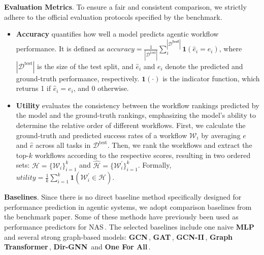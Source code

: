 \textbf{Evaluation Metrics}. To ensure a fair and consistent comparison, we strictly adhere to the official evaluation protocols specified by the benchmark.
\begin{itemize}[leftmargin=12pt, nosep, noitemsep]
    \item \textbf{Accuracy} quantifies how well a model predicts agentic workflow performance. It is defined as $accuracy = \frac{1}{|\mathcal{D}^{\text{test}}|} \sum_{i}^{|\mathcal{D}^{\textbf{test}}|}\mathbf{1}(\hat{e}_i = e_i)$, where $|\mathcal{D}^{\text{test}}|$ is the size of the test split, and $\hat{e}_i$ and $e_i$ denote the predicted and ground-truth performance, respectively. $\mathbf{1}(\cdot)$ is the indicator function, which returns 1 if $\hat{e}_i = e_i$, and 0 otherwise.

    \item \textbf{Utility} evaluates the consistency between the workflow rankings predicted by the model and the ground-truth rankings, emphasizing the model's ability to determine the relative order of different workflows. First, we calculate the ground-truth and predicted success rates of a workflow $\mathcal{W}_i$ by averaging $e$ and $\hat{e}$ across all tasks in $\mathcal{D}^{\text{test}}$. Then, we rank the workflows and extract the top-$k$ workflows according to the respective scores, resulting in two ordered sets: $\mathcal{H} = \{\mathcal{W}_i\}_{i=1}^k$ and $\hat{\mathcal{H}} = \{\mathcal{W}^\prime_i\}_{i=1}^k$. Formally, $utility = \frac{1}{k}\sum_{i=1}^k \mathbf{1}(\mathcal{W}^\prime_i \in \mathcal{H})$.
\end{itemize}


\textbf{Baselines}. Since there is no direct baseline method specifically designed for performance prediction in agentic systems, we adopt comparison baselines from the benchmark paper. Some of these methods have previously been used as performance predictors for NAS\,\citep{powerful_nas_predictor_NeurIPS_21}. The selected baselines include one naive \textbf{MLP} and several strong graph-based models: \textbf{GCN}\,\citep{GCN_ICLR_17}, \textbf{GAT}\,\citep{GAT_ICLR_18}, \textbf{GCN-II}\,\citep{GCNII_ICML_20}, \textbf{Graph Transformer}\,\citep{GT_IJCAI_21}, \textbf{Dir-GNN}\,\citep{DirGNN_2024} and \textbf{One For All}\,\citep{OFA_ICLR_24}.


